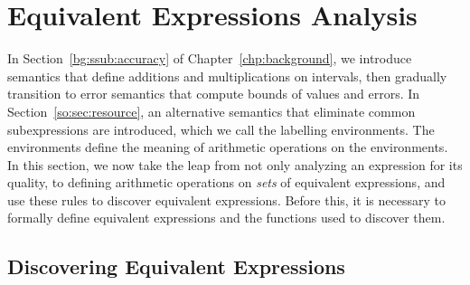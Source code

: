 \section{Equivalent Expressions Analysis}
\label{so:sec:equivalent}

In Section~\ref{bg:ssub:accuracy} of Chapter~\ref{chp:background}, we introduce
semantics that define additions and multiplications on intervals, then
gradually transition to error semantics that compute bounds of values and
errors.  In Section~\ref{so:sec:resource}, an alternative semantics that
eliminate common subexpressions are introduced, which we call the labelling
environments.  The environments define the meaning of arithmetic operations
on the environments.  In this section, we now take the leap from not only
analyzing an expression for its quality, to defining arithmetic operations
on \emph{sets} of equivalent expressions, and use these rules to discover
equivalent expressions.  Before this, it is necessary to formally define
equivalent expressions and the functions used to discover them.


\subsection{Discovering Equivalent Expressions}
\label{so:sub:equivalent_relations}

